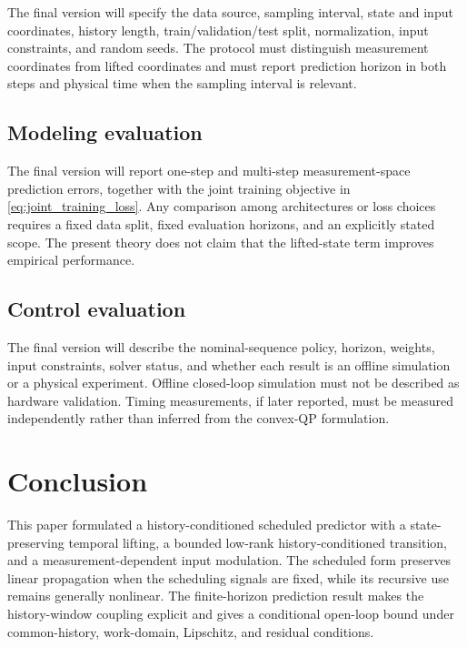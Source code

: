 ﻿\documentclass[journal]{IEEEtran}
\begin{document}
The final version will specify the data source, sampling interval, state and input coordinates, history length, train/validation/test split, normalization, input constraints, and random seeds. The protocol must distinguish measurement coordinates from lifted coordinates and must report prediction horizon in both steps and physical time when the sampling interval is relevant.

\subsection{Modeling evaluation}

The final version will report one-step and multi-step measurement-space prediction errors, together with the joint training objective in \eqref{eq:joint_training_loss}. Any comparison among architectures or loss choices requires a fixed data split, fixed evaluation horizons, and an explicitly stated scope. The present theory does not claim that the lifted-state term improves empirical performance.

\subsection{Control evaluation}

The final version will describe the nominal-sequence policy, horizon, weights, input constraints, solver status, and whether each result is an offline simulation or a physical experiment. Offline closed-loop simulation must not be described as hardware validation. Timing measurements, if later reported, must be measured independently rather than inferred from the convex-QP formulation.

\section{Conclusion}
\label{sec:conclusion}

This paper formulated a history-conditioned scheduled predictor with a state-preserving temporal lifting, a bounded low-rank history-conditioned transition, and a measurement-dependent input modulation. The scheduled form preserves linear propagation when the scheduling signals are fixed, while its recursive use remains generally nonlinear. The finite-horizon prediction result makes the history-window coupling explicit and gives a conditional open-loop bound under common-history, work-domain, Lipschitz, and residual conditions.
\end{document}
